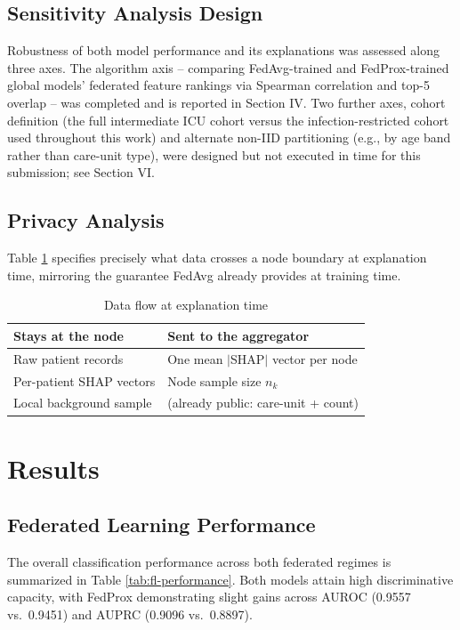 \documentclass[conference]{IEEEtran}
\begin{document}
\subsection{Sensitivity Analysis Design}
Robustness of both model performance and its explanations was assessed
along three axes. The algorithm axis -- comparing FedAvg-trained and
FedProx-trained global models' federated feature rankings via Spearman
correlation and top-5 overlap -- was completed and is reported in Section
IV. Two further axes, cohort definition (the full intermediate ICU cohort
versus the infection-restricted cohort used throughout this work) and
alternate non-IID partitioning (e.g., by age band rather than care-unit
type), were designed but not executed in time for this submission; see
Section VI.

\subsection{Privacy Analysis}
Table \ref{tab:privacy} specifies precisely what data crosses a node
boundary at explanation time, mirroring the guarantee FedAvg already
provides at training time.

\begin{table}[h]
\centering
\caption{Data flow at explanation time}
\label{tab:privacy}
\begin{tabular}{@{}ll@{}}
\toprule
\textbf{Stays at the node} & \textbf{Sent to the aggregator} \\
\midrule
Raw patient records & One mean $|$SHAP$|$ vector per node \\
Per-patient SHAP vectors & Node sample size $n_k$ \\
Local background sample & (already public: care-unit + count) \\
\bottomrule
\end{tabular}
\end{table}

\section{Results}

\subsection{Federated Learning Performance}
The overall classification performance across both federated regimes is
summarized in Table \ref{tab:fl-performance}. Both models attain high
discriminative capacity, with FedProx demonstrating slight gains across
AUROC (0.9557 vs.\ 0.9451) and AUPRC (0.9096 vs.\ 0.8897).
\end{document}
